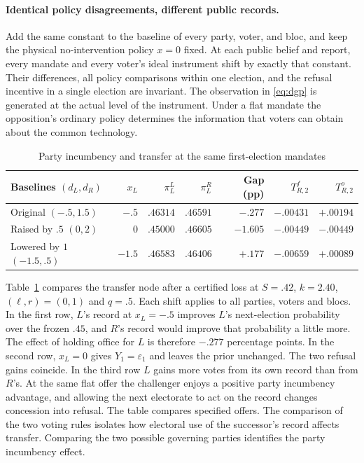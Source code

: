 \documentclass[11pt,letterpaper]{article}
\begin{document}
\paragraph{Identical policy disagreements, different public records.}
Add the same constant to the baseline of every party, voter, and bloc, and keep the physical no-intervention policy $x=0$ fixed. At each public belief and report, every mandate and every voter's ideal instrument shift by exactly that constant. Their differences, all policy comparisons within one election, and the refusal incentive in a single election are invariant. The observation in \eqref{eq:dgp} is generated at the actual level of the instrument. Under a flat mandate the opposition's ordinary policy determines the information that voters can obtain about the common technology.

\begin{table}[htbp]\centering\small
\caption{Party incumbency and transfer at the same first-election mandates}\label{tab:shift}
\smallskip
\begin{tabular}{@{}lrrrrrr@{}}\toprule
Baselines $(d_L,d_R)$ & $x_L$ & $\pi_L^L$ & $\pi_L^R$ & Gap (pp) & $T_{R,2}^{f}$ & $T_{R,2}^{o}$\\ \midrule
Original $(-.5,1.5)$ & $-.5$ & $.46314$ & $.46591$ & $-.277$ & $-.00431$ & $+.00194$\\
Raised by $.5$ $(0,2)$ & $0$ & $.45000$ & $.46605$ & $-1.605$ & $-.00449$ & $-.00449$\\
Lowered by $1$ $(-1.5,.5)$ & $-1.5$ & $.46583$ & $.46406$ & $+.177$ & $-.00659$ & $+.00089$\\ \bottomrule
\end{tabular}
\end{table}

Table~\ref{tab:shift} compares the transfer node after a certified loss at $S=.42$, $k=2.40$, $(\ell,r)=(0,1)$ and $q=.5$. Each shift applies to all parties, voters and blocs. In the first row, $L$'s record at $x_L=-.5$ improves $L$'s next-election probability over the frozen $.45$, and $R$'s record would improve that probability a little more. The effect of holding office for $L$ is therefore $-.277$ percentage points. In the second row, $x_L=0$ gives $Y_1=\varepsilon_1$ and leaves the prior unchanged. The two refusal gains coincide. In the third row $L$ gains more votes from its own record than from $R$'s. At the same flat offer the challenger enjoys a positive party incumbency advantage, and allowing the next electorate to act on the record changes concession into refusal. The table compares specified offers. The comparison of the two voting rules isolates how electoral use of the successor's record affects transfer. Comparing the two possible governing parties identifies the party incumbency effect.
\end{document}
